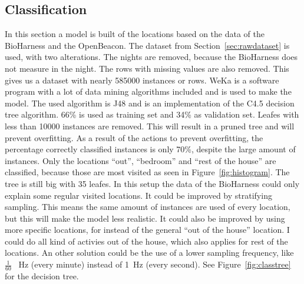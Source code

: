 	\subsection{Classification}
	\label{sec:classification}
	In this section a model is built of the locations based on the data of the BioHarness and the OpenBeacon. The dataset from Section~\ref{sec:rawdataset}  is used, with two alterations. The nights are removed, because the BioHarness does not measure in the night. The rows with missing values are also removed. This gives us a dataset with nearly 585000 instances or rows. WeKa \cite{weka} is a software program with a lot of data mining algorithms included and is used to make the model. The used algorithm is J48 and is an implementation of the C4.5 \cite{quinlan1993c4} decision tree algorithm. 66\% is used as training set and 34\% as validation set. Leafes with less than 10000 instances are removed. This will result in a pruned tree and will prevent overfitting. As a result of the actions to prevent overfitting, the percentage correctly classified instances is only 70\%, despite the large amount of instances. Only the locations ``out'', ``bedroom'' and ``rest of the house'' are classified, because those are most visited as seen in Figure~\ref{fig:histogram}. The tree is still big with 35 leafes. In this setup the data of the BioHarness could only explain some regular visited locations. It could be improved by stratifying sampling. This means the same amount of instances are used of every location, but this will make the model less realistic. It could also be improved by using more specific locations, for instead of the general ``out of the house'' location. I could do all kind of activies out of the house, which also applies for rest of the locations. An other solution could be the use of a lower sampling frequency, like $\frac{1}{60}$ \SI{}{\hertz} (every minute) instead of \SI{1}{\hertz} (every second). See Figure~\ref{fig:classtree} for the decision tree. \\
